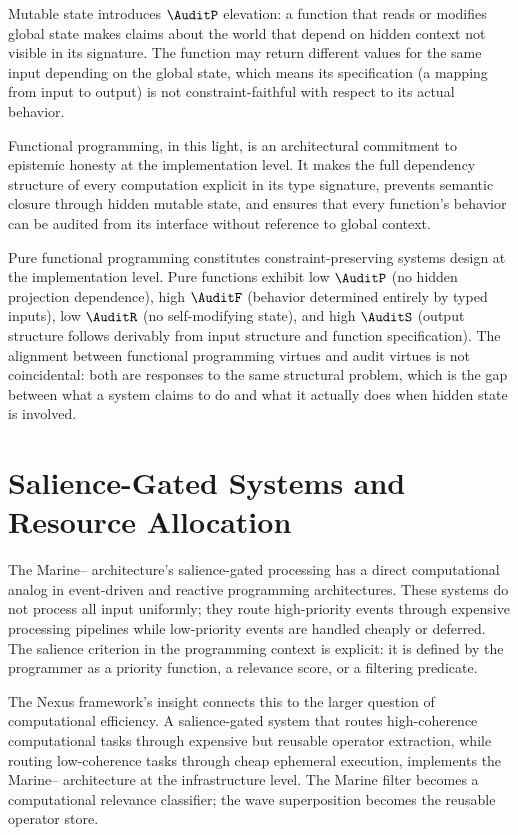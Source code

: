 Mutable state introduces $\AuditP$ elevation: a function
that reads or modifies global state makes claims about
the world that depend on hidden context not visible
in its signature. The function may return different
values for the same input depending on the global
state, which means its specification (a mapping from
input to output) is not constraint-faithful with
respect to its actual behavior.

Functional programming, in this light, is an architectural
commitment to epistemic honesty at the implementation
level. It makes the full dependency structure of every
computation explicit in its type signature, prevents
semantic closure through hidden mutable state, and
ensures that every function's behavior can be audited
from its interface without reference to global context.

\begin{auditprop}
\label{ap:functional-purity}
Pure functional programming constitutes constraint-preserving
systems design at the implementation level. Pure functions
exhibit low $\AuditP$ (no hidden projection dependence),
high $\AuditF$ (behavior determined entirely by typed
inputs), low $\AuditR$ (no self-modifying state), and
high $\AuditS$ (output structure follows derivably
from input structure and function specification). The
alignment between functional programming virtues and
\Ortyx{} audit virtues is not coincidental: both are
responses to the same structural problem, which is
the gap between what a system claims to do and what
it actually does when hidden state is involved.
\end{auditprop}

\section{Salience-Gated Systems and Resource Allocation}
\label{sec:salience-gated-systems}

The Marine--\MEMeight{} architecture's salience-gated
processing has a direct computational analog in
event-driven and reactive programming architectures.
These systems do not process all input uniformly;
they route high-priority events through expensive
processing pipelines while low-priority events are
handled cheaply or deferred. The salience criterion
in the programming context is explicit: it is defined
by the programmer as a priority function, a relevance
score, or a filtering predicate.

The Nexus framework's insight connects this to the
larger question of computational efficiency. A
salience-gated system that routes high-coherence
computational tasks through expensive but reusable
operator extraction, while routing low-coherence tasks
through cheap ephemeral execution, implements the
Marine--\MEMeight{} architecture at the infrastructure
level. The Marine filter becomes a computational
relevance classifier; the \MEMeight{} wave superposition
becomes the reusable operator store.

